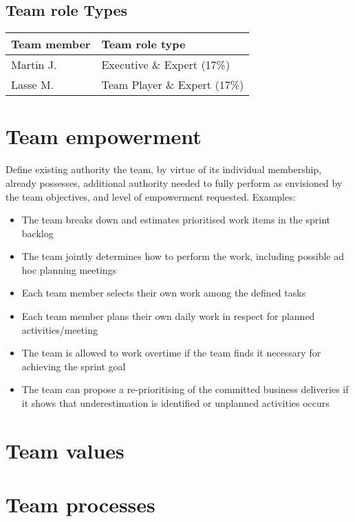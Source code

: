 \documentclass{article}
\begin{document}
\subsection{Team role Types}

\begin{tabel}
    \centering
    \begin{tabular}{l|l}
        \rowcolor{Gray}
        \textbf{Team member} & \textbf{Team role type}\\\hline
        Martin J.            & Executive \& Expert (17\%) \\
        Lasse M.             & Team Player \& Expert (17\%)
    \end{tabular}
    \label{tab:roleTypes}
\end{tabel}

\section{Team empowerment}
Define existing authority the team, by virtue of its individual membership, already possesses, additional
authority needed to fully perform as envisioned by the team objectives, and level of empowerment requested.
Examples:
\begin{itemize}
    \item The team breaks down and estimates prioritised work items in the sprint backlog
    \item The team jointly determines how to perform the work, including possible ad hoc planning meetings
    \item Each team member selects their own work among the defined tasks
    \item Each team member plans their own daily work in respect for planned activities/meeting
    \item The team is allowed to work overtime if the team finds it necessary for achieving the sprint goal
    \item The team can propose a re-prioritising of the committed business deliveries if it shows that underestimation is identified or unplanned activities occurs
\end{itemize}

\section{Team values}

\section{Team processes}
\end{document}
